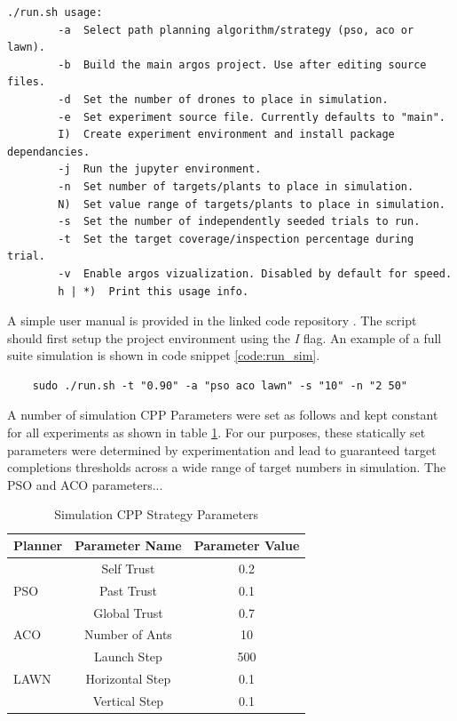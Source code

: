 \documentclass{report}
\newenvironment{code}{\captionsetup{type=listing}}{}
\begin{document}
\begin{code}
\begin{verbatim}
./run.sh usage:
        -a  Select path planning algorithm/strategy (pso, aco or lawn).
        -b  Build the main argos project. Use after editing source files.
        -d  Set the number of drones to place in simulation.
        -e  Set experiment source file. Currently defaults to "main".
        I)  Create experiment environment and install package dependancies.
        -j  Run the jupyter environment.
        -n  Set number of targets/plants to place in simulation.
        N)  Set value range of targets/plants to place in simulation.
        -s  Set the number of independently seeded trials to run.
        -t  Set the target coverage/inspection percentage during trial.
        -v  Enable argos vizualization. Disabled by default for speed.
        h | *)  Print this usage info.
\end{verbatim}
\label{code:script_help}
\end{code}
\vspace{1cm}

A simple user manual is provided in the linked code repository \cite{SWARMCODE}. The script should first setup the project environment using the \textit{I} flag. An example of a full suite simulation is shown in code snippet \ref{code:run_sim}.

\begin{code}
\begin{verbatim}
	sudo ./run.sh -t "0.90" -a "pso aco lawn" -s "10" -n "2 50"
\end{verbatim}
\label{code:run_sim}
\end{code}
\vspace{1cm}

A number of simulation CPP Parameters were set as follows and kept constant for all experiments as shown in table \ref{tab:sim_cpp_params}. For our purposes, these statically set parameters were determined by experimentation and lead to guaranteed target completions thresholds across a wide range of target numbers in simulation. The PSO and ACO parameters...

\bgroup
\def\arraystretch{1.5}%
\begin{table}[h]
  \centering
  \begin{tabular}{|l|c|c|}
  \hline
  \textbf{Planner} & \textbf{Parameter Name} & \textbf{Parameter Value} \\
  \hline
  \multirow{3}{*}{PSO} & Self Trust & 0.2 \\
	& Past Trust & 0.1 \\
	& Global Trust & 0.7 \\
  \hline
  ACO & Number of Ants & 10 \\
  \hline
  \multirow{3}{*}{LAWN} & Launch Step & 500 \\
	& Horizontal Step & 0.1 \\
	& Vertical Step & 0.1 \\
  \hline
  \end{tabular}
  \caption{Simulation CPP Strategy Parameters}
  \label{tab:sim_cpp_params}
\end{table}
\egroup
\end{document}
